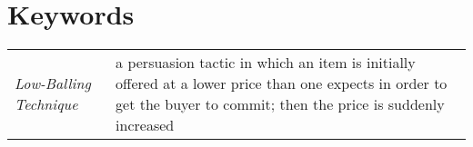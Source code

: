 \section*{Keywords}
\begin{tabularx}{\textwidth}{ l X }
    \textit{Low-Balling Technique} & a persuasion tactic in which an item is initially offered at a lower price than one expects in order to get the buyer to commit; then the price is suddenly increased \\ 
\end{tabularx}
